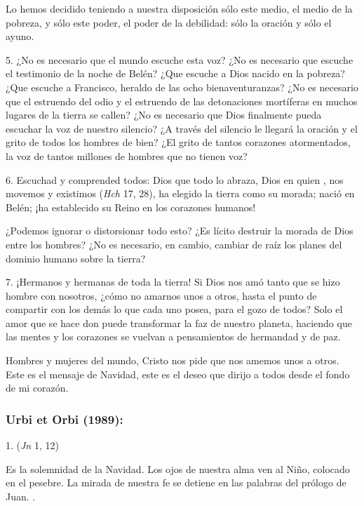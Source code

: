 \begin{body}
\begin{body}
		Lo hemos decidido teniendo a nuestra disposición sólo este medio, el medio de la pobreza, y sólo este poder, el poder de la debilidad: sólo la oración y sólo el ayuno.
		
		5. ¿No es necesario que el mundo escuche esta voz? ¿No es necesario que escuche el testimonio de la noche de Belén? ¿Que escuche a Dios nacido en la pobreza? ¿Que escuche a Francisco, heraldo de las ocho bienaventuranzas? ¿No es necesario que el estruendo del odio y el estruendo de las detonaciones mortíferas en muchos lugares de la tierra se callen? ¿No es necesario que Dios finalmente pueda escuchar la voz de nuestro silencio? ¿A través del silencio le llegará la oración y el grito de todos los hombres de bien? ¿El grito de tantos corazones atormentados, la voz de tantos millones de hombres que no tienen voz?
		
		6. Escuchad y comprended todos: Dios que todo lo abraza, Dios en quien , nos movemos y existimos (\emph{Hch} 17, 28), ha elegido la tierra como su morada; nació en Belén; ¡ha establecido su Reino en los corazones humanos!
		
		¿Podemos ignorar o distorsionar todo esto? ¿Es lícito destruir la morada de Dios entre los hombres? ¿No es necesario, en cambio, cambiar de raíz los planes del dominio humano sobre la tierra?
		
		7. ¡Hermanos y hermanas de toda la tierra! Si Dios nos amó tanto que se hizo hombre con nosotros, ¿cómo no amarnos unos a otros, hasta el punto de compartir con los demás lo que cada uno posea, para el gozo de todos? Solo el amor que se hace don puede transformar la faz de nuestro planeta, haciendo que las mentes y los corazones se vuelvan a pensamientos de hermandad y de paz.
		
		Hombres y mujeres del mundo, Cristo nos pide que nos amemos unos a otros. Este es el mensaje de Navidad, este es el deseo que dirijo a todos desde el fondo de mi corazón.
	\end{body}
	
	\subsubsection{Urbi et Orbi (1989): }
	
	\begin{body}
		1.  (\emph{Jn} 1, 12)
		
		Es la solemnidad de la Navidad. Los ojos de nuestra alma ven al Niño, colocado en el pesebre. La mirada de nuestra fe se detiene en las palabras del prólogo de Juan. .
		

\end{body}
\end{body}
